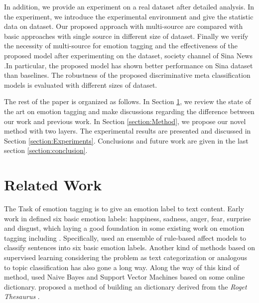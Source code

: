 \documentclass{IEEEtran}
\begin{document}
In addition, we provide an experiment on a real dataset after detailed analysis. In the experiment, we introduce the experimental environment and give the statistic data on dataset. Our proposed approach with multi-source are compared with basic approaches with single source in different size of dataset. Finally we verify the necessity of multi-source for emotion tagging and the effectiveness of the proposed model after experimenting on the dataset, society channel of Sina News .In particular, the proposed model has shown better performance on Sina dataset than baselines. The robustness of the proposed discriminative meta classification models is evaluated with different sizes of dataset. 


The rest of the paper is organized as follows. In Section \ref{section:RelatedWork}, we review the state of the art on emotion tagging and make discussions regarding the difference between our work and previous work. In Section \ref{section:Method}, we propose our novel method with two layers. The experimental results are presented and discussed in Section \ref{section:Experiments}. Conclusions and future work are given in the last section \ref{section:conclusion}.

\section{Related Work}
\label{section:RelatedWork}

The Task of emotion tagging is to give an emotion label to text content. Early work in \citet{ekman1992argument} defined six basic emotion labels: happiness, sadness, anger, fear, surprise and disgust, which laying a good foundation in some existing work on emotion tagging including \citet{liu2003model, das2009word, das2010sentence, aman2008using}.
Specifically, \citet{liu2003model} used an ensemble of rule-based affect models to classify sentences into six basic emotion labels. Another kind of methods based on supervised learning considering the problem as text categorization or analogous to topic classification \citet{alm2005emotions} has also gone a long way. Along the way of this kind of method, \citet{das2009word, das2010sentence} used Naive Bayes and Support Vector Machines based on some online dictionary. \citet{aman2008using} proposed a method of building an dictionary derived from the \textit{Roget Thesaurus} \citet{roget1852}.
\end{document}
